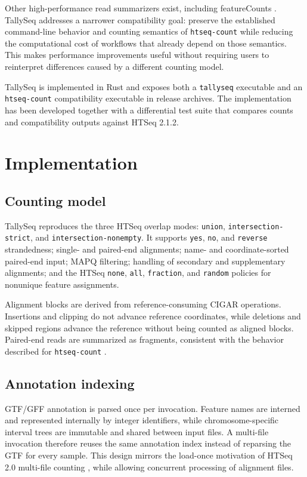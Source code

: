 \documentclass[11pt]{article}
\begin{document}
Other high-performance read summarizers exist, including featureCounts \citep{Liao2014}. TallySeq addresses a narrower compatibility goal: preserve the established command-line behavior and counting semantics of \texttt{htseq-count} while reducing the computational cost of workflows that already depend on those semantics. This makes performance improvements useful without requiring users to reinterpret differences caused by a different counting model.

TallySeq is implemented in Rust and exposes both a \texttt{tallyseq} executable and an \texttt{htseq-count} compatibility executable in release archives. The implementation has been developed together with a differential test suite that compares counts and compatibility outputs against HTSeq 2.1.2.

\section{Implementation}

\subsection{Counting model}

TallySeq reproduces the three HTSeq overlap modes: \texttt{union}, \texttt{intersection-strict}, and \texttt{intersection-nonempty}. It supports \texttt{yes}, \texttt{no}, and \texttt{reverse} strandedness; single- and paired-end alignments; name- and coordinate-sorted paired-end input; MAPQ filtering; handling of secondary and supplementary alignments; and the HTSeq \texttt{none}, \texttt{all}, \texttt{fraction}, and \texttt{random} policies for nonunique feature assignments.

Alignment blocks are derived from reference-consuming CIGAR operations. Insertions and clipping do not advance reference coordinates, while deletions and skipped regions advance the reference without being counted as aligned blocks. Paired-end reads are summarized as fragments, consistent with the behavior described for \texttt{htseq-count} \citep{Anders2015}.

\subsection{Annotation indexing}

GTF/GFF annotation is parsed once per invocation. Feature names are interned and represented internally by integer identifiers, while chromosome-specific interval trees are immutable and shared between input files. A multi-file invocation therefore reuses the same annotation index instead of reparsing the GTF for every sample. This design mirrors the load-once motivation of HTSeq 2.0 multi-file counting \citep{Putri2022}, while allowing concurrent processing of alignment files.
\end{document}
